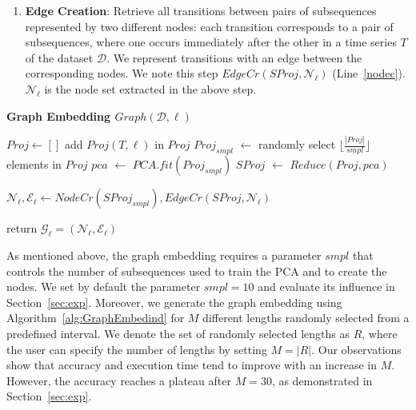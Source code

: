 {\begin{enumerate}[noitemsep, topsep=1pt, parsep=1pt, partopsep=1pt, leftmargin=0.5cm]
    \item {\bf Edge Creation}: Retrieve all transitions between pairs of subsequences represented by two different nodes: each transition corresponds to a pair of subsequences, where one occurs immediately after the other in a time series $T$ of the dataset $\mathcal{D}$. We represent transitions with an edge between the corresponding nodes. We note this step $EdgeCr(SProj,\mathcal{N}_\ell)$ (Line~\ref{nodec}). $\mathcal{N}_\ell$ is the node set extracted in the above step.
\end{enumerate}
}
\IncMargin{0.5em}
\begin{algorithm}[tb]
{\small
    \caption{\textbf{Graph Embedding $Graph(\mathcal{D},\ell)$}}\label{alg:GraphEmbedind}
    \BlankLine
    $Proj \leftarrow []$\;
    {
        add $Proj(T,\ell)$ in $Proj$\;\label{concatenation}
    }
    $Proj_{smpl}$ $\leftarrow$ randomly select $\lfloor\frac{|Proj|}{smpl}\rfloor$ elements in $Proj$\;
    $pca$ $\leftarrow$ $PCA.fit(Proj_{smpl})$\;\label{pcatrain}
    $SProj$ $\leftarrow$ $Reduce(Proj,pca)$\;

    $\mathcal{N}_\ell, \mathcal{E}_\ell \leftarrow NodeCr(SProj_{smpl}), EdgeCr(SProj,\mathcal{N}_\ell)$\;\label{nodec}

    return $\mathcal{G}_\ell = (\mathcal{N}_\ell,\mathcal{E}_\ell)$

    
} %
\end{algorithm}
\DecMargin{0.5em}



As mentioned above, the graph embedding requires a parameter $smpl$ that controls the number of subsequences used to train the PCA and to create the nodes. 
We set by default the parameter $smpl=10$ and evaluate its influence in Section~\ref{sec:exp}. 
Moreover, we generate the graph embedding using Algorithm~\ref{alg:GraphEmbedind} for $M$ different lengths randomly selected from a predefined interval. 
We denote the set of randomly selected lengths as $R$, where the user can specify the number of lengths by setting $M = |R|$. 
Our observations show that accuracy and execution time tend to improve with an increase in $M$. However, the accuracy reaches a plateau after $M=30$, as demonstrated in Section~\ref{sec:exp}.

